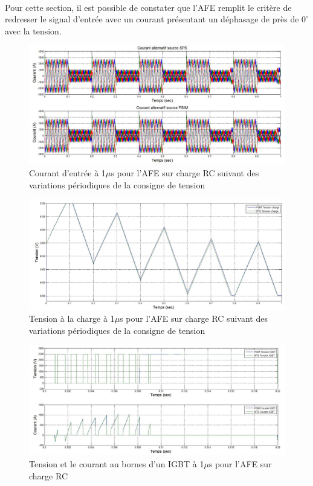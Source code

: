 \paragraph{}Pour cette section, il est possible de constater que l'AFE remplit le critère de redresser le signal d'entrée avec un courant présentant un déphasage de près de $0^\circ$ avec la tension.
\begin{figure}[htb]
\centering
\includegraphics[scale=0.5]{fig/coual_afe.jpg}
\caption{Courant d'entrée à 1$\mu$s pour l'AFE sur charge RC suivant des variations périodiques de la consigne de tension}
\label{AF_RC_cou}
\end{figure}




\begin{figure}[htb]
\centering
\includegraphics[scale=0.5]{fig/ten_afe.jpg}
\caption{Tension à la charge à 1$\mu$s pour l'AFE sur charge RC suivant des variations périodiques de la consigne de tension}
\label{AF_RC_ten}
\end{figure}



\begin{figure}[htb]
\centering
\includegraphics[scale=0.5]{fig/com_afe.jpg}
\caption{Tension et le courant au bornes d'un IGBT à 1$\mu$s pour l'AFE sur charge RC}
\label{AF_RC_igbt}
\end{figure}

